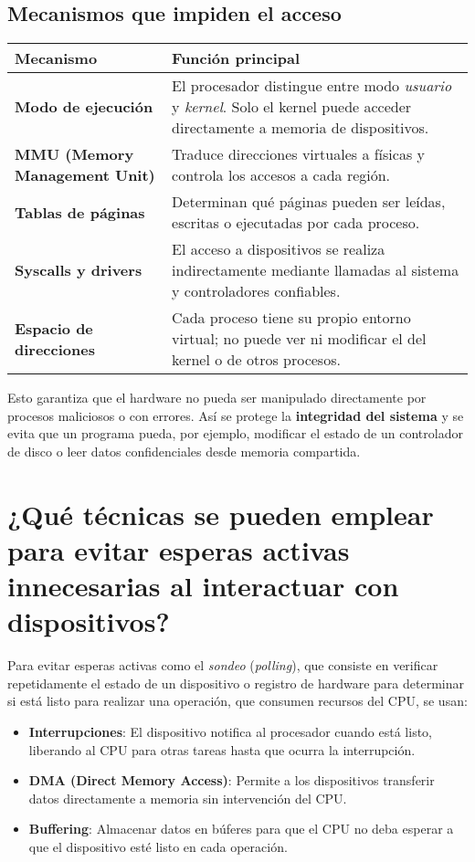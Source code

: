 \documentclass{article}
\begin{document}
\begin{itemize}
\subsection*{Mecanismos que impiden el acceso}

\begin{center}
\begin{tabular}{>{\bfseries}m{4cm} m{10cm}}
\toprule
Mecanismo & Función principal \\
\midrule
Modo de ejecución & El procesador distingue entre modo \textit{usuario} y \textit{kernel}. Solo el kernel puede acceder directamente a memoria de dispositivos. \\
MMU (Memory Management Unit) & Traduce direcciones virtuales a físicas y controla los accesos a cada región. \\
Tablas de páginas & Determinan qué páginas pueden ser leídas, escritas o ejecutadas por cada proceso. \\
Syscalls y drivers & El acceso a dispositivos se realiza indirectamente mediante llamadas al sistema y controladores confiables. \\
Espacio de direcciones & Cada proceso tiene su propio entorno virtual; no puede ver ni modificar el del kernel o de otros procesos. \\
\bottomrule
\end{tabular}
\end{center}


\bigskip

Esto garantiza que el hardware no pueda ser manipulado directamente por procesos maliciosos o con errores. Así se protege la \textbf{integridad del sistema} y se evita que un programa pueda, por ejemplo, modificar el estado de un controlador de disco o leer datos confidenciales desde memoria compartida.

\section{¿Qué técnicas se pueden emplear para evitar esperas activas innecesarias al interactuar con dispositivos?}

Para evitar esperas activas como el \textit{sondeo} (\textit{polling}), que consiste en verificar repetidamente el estado de un dispositivo o registro de hardware para determinar si está listo para realizar una operación, que consumen recursos del CPU, se usan:
\begin{itemize}
    \item \textbf{Interrupciones}: El dispositivo notifica al procesador cuando está listo, liberando al CPU para otras tareas hasta que ocurra la interrupción.
    \item \textbf{DMA (Direct Memory Access)}: Permite a los dispositivos transferir datos directamente a memoria sin intervención del CPU.
    \item \textbf{Buffering}: Almacenar datos en búferes para que el CPU no deba esperar a que el dispositivo esté listo en cada operación.
\end{itemize}


\end{itemize}
\end{document}
